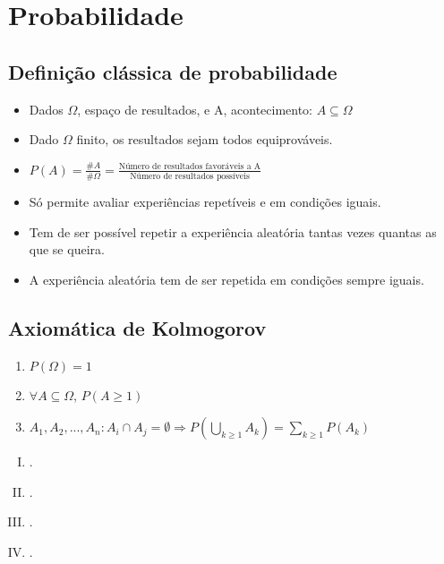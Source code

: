 \section{Probabilidade}

\subsection{Definição clássica de probabilidade}
\begin{itemize}
    \item Dados $\Omega$, espaço de resultados, e A, acontecimento: $A \subseteq \Omega$
    \item Dado $\Omega$ finito, os resultados sejam todos equiprováveis.
    \item $P(A) = \frac{\# A}{\# \Omega} = \frac{\text{Número de resultados favoráveis a A}}{\text{Número de resultados possíveis}}$
    \item Só permite avaliar experiências repetíveis e em condições iguais.
    \item Tem de ser possível repetir a experiência aleatória tantas vezes quantas as que se queira.
    \item A experiência aleatória tem de ser repetida em condições sempre iguais.
\end{itemize}

\subsection{Axiomática de Kolmogorov}
\begin{enumerate}
    \item $P(\Omega) = 1$
    \item $\forall A \subseteq \Omega$, $P(A \geq 1)$
    \item $A_1, A_2, ..., A_n: A_i \cap A_j = \emptyset \Rightarrow P (\bigcup\limits_{k \geq 1} A_k) = \sum\limits_{k\geq 1} P(A_k)$
\end{enumerate}
\begin{enumerate}[I)]
    \item .
    \item .
    \item .
    \item .
\end{enumerate}